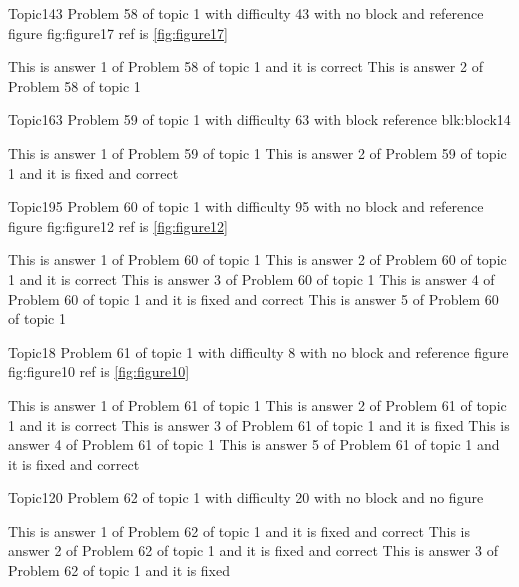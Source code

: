 \documentclass[master]{exam}
\begin{document}
\begin{problem}{Topic1}{43}
	Problem 58 of topic 1 with difficulty 43 with no block and reference figure fig:figure17 ref is \ref{fig:figure17}
	\begin{answers}
		\answer[correct] This is answer 1 of Problem 58 of topic 1 and it is correct
		\answer This is answer 2 of Problem 58 of topic 1 
	\end{answers}
\end{problem}

\begin{problem}[requires=blk:block14]{Topic1}{63}
	Problem 59 of topic 1 with difficulty 63 with block reference blk:block14
	\begin{answers}
		\answer This is answer 1 of Problem 59 of topic 1 
		 This is answer 2 of Problem 59 of topic 1 and it is fixed and correct
	\end{answers}
\end{problem}

\begin{problem}{Topic1}{95}
	Problem 60 of topic 1 with difficulty 95 with no block and reference figure fig:figure12 ref is \ref{fig:figure12}
	\begin{answers}
		\answer This is answer 1 of Problem 60 of topic 1 
		\answer[correct] This is answer 2 of Problem 60 of topic 1 and it is correct
		\answer This is answer 3 of Problem 60 of topic 1 
		 This is answer 4 of Problem 60 of topic 1 and it is fixed and correct
		\answer This is answer 5 of Problem 60 of topic 1 
	\end{answers}
\end{problem}

\begin{problem}{Topic1}{8}
	Problem 61 of topic 1 with difficulty 8 with no block and reference figure fig:figure10 ref is \ref{fig:figure10}
	\begin{answers}
		\answer This is answer 1 of Problem 61 of topic 1 
		\answer[correct] This is answer 2 of Problem 61 of topic 1 and it is correct
		\answer[fixed] This is answer 3 of Problem 61 of topic 1 and it is fixed
		\answer This is answer 4 of Problem 61 of topic 1 
		 This is answer 5 of Problem 61 of topic 1 and it is fixed and correct
	\end{answers}
\end{problem}

\begin{problem}{Topic1}{20}
	Problem 62 of topic 1 with difficulty 20 with no block and no figure
	\begin{answers}
		 This is answer 1 of Problem 62 of topic 1 and it is fixed and correct
		 This is answer 2 of Problem 62 of topic 1 and it is fixed and correct
		\answer[fixed] This is answer 3 of Problem 62 of topic 1 and it is fixed
	\end{answers}
\end{problem}
\end{document}
